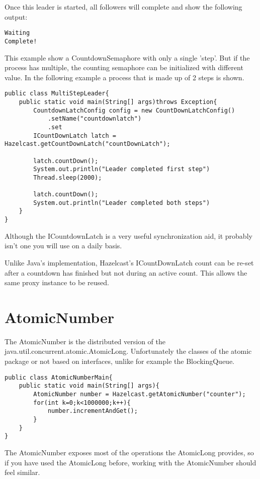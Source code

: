 Once this leader is started, all followers will complete and show the following output:

\begin{verbatim}
Waiting
Complete!
\end{verbatim}

This example show a CountdownSemaphore with only a single 'step'. But if the process has multiple,
the counting semaphore can be initialized with different value. In the following example a 
process that is made up of 2 steps is shown.

\begin{verbatim}
public class MultiStepLeader{
    public static void main(String[] args)throws Exception{
        CountdownLatchConfig config = new CountDownLatchConfig()
            .setName("countdownlatch")
            .set
        ICountDownLatch latch = Hazelcast.getCountDownLatch("countDownLatch");
        
        latch.countDown();
        System.out.println("Leader completed first step")
        Thread.sleep(2000); 

        latch.countDown();
        System.out.println("Leader completed both steps")
    }
}
\end{verbatim}

Although the ICountdownLatch is a very useful synchronization aid, it probably isn't one
you will use on a daily basis.

Unlike Java's implementation, Hazelcast's ICountDownLatch count can be re-set
after a countdown has finished but not during an active count. This allows the same
proxy instance to be reused.

\section{AtomicNumber}

The AtomicNumber is the distributed version of the java.util.concurrent.atomic.AtomicLong.
Unfortunately the classes of the atomic package or not based on interfaces, unlike for example
the BlockingQueue. 

\begin{verbatim}
public class AtomicNumberMain{
    public static void main(String[] args){
        AtomicNumber number = Hazelcast.getAtomicNumber("counter");
        for(int k=0;k<1000000;k++){
            number.incrementAndGet();
        }
    }
}
\end{verbatim}

The AtomicNumber exposes most of the operations the AtomicLong provides, so if you have used the
AtomicLong before, working with the AtomicNumber should feel similar.

